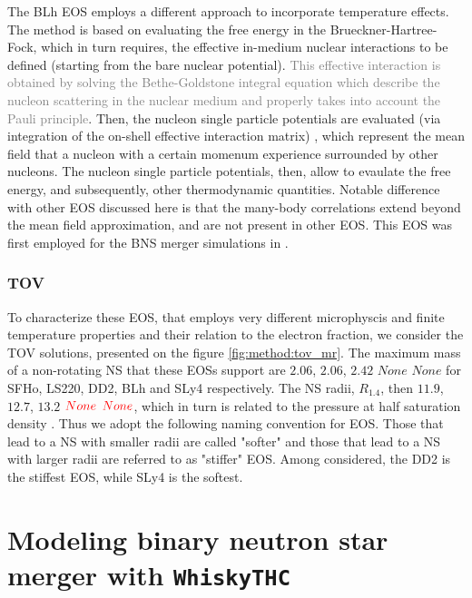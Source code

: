 \documentclass[11pt,a4paper,headinclude=true,DIV=14,BCOR=8mm,chapterprefix,listof=totoc,twoside,openright,abstracton]{scrbook}
\newcommand{\red}[1]{\textcolor{red}{#1}}
\newcommand{\gray}[1]{\textcolor{gray}{#1}}
\begin{document}
The BLh EOS employs a different approach to incorporate temperature effects.
The method is based on evaluating the free energy in the Brueckner-Hartree-Fock, which in turn requires,
the effective in-medium nuclear interactions to be defined (starting from the bare nuclear potential).
\gray{This effective interaction is obtained by solving
the Bethe-Goldstone integral equation which describe the nucleon 
scattering in the nuclear medium and properly takes into
account the Pauli principle}.
Then, the nucleon single particle potentials are evaluated (via integration of the on-shell effective interaction matrix)
, which represent the mean field that a nucleon with a certain momenum experience surrounded by other nucleons.
The nucleon single particle potentials, then, allow to evaulate the free energy, and subsequently, 
other thermodynamic quantities.
Notable difference with other EOS discussed here is that the many-body correlations extend beyond the mean field approximation, and are not present in other EOS. 
This EOS was first employed for the BNS merger simulations in \cite{Bernuzzi:2020txg}.

\subsubsection{TOV}

To characterize these EOS, that employs very different microphyscis and finite temperature properties and their relation to the electron fraction, we consider the TOV solutions, presented on the figure \ref{fig:method:tov_mr}.
The maximum mass of a non-rotating NS that these EOSs support are $2.06$, $2.06$, $2.42$ $None$ $None$ 
for SFHo, LS220, DD2, BLh and SLy4 respectively. The NS radii, $R_{1.4}$, then $11.9$, $12.7$, $13.2$ $\red{None}$ $\red{None}$, which in turn is related to the pressure at half saturation density \cite{Lattimer:2012nd}. Thus we adopt the following naming convention for EOS. Those that lead to a NS with smaller radii are called "softer" and those that lead to a NS with larger radii are referred to as "stiffer" EOS.
Among considered, the DD2 is the stiffest EOS, while SLy4 is the softest.



\section{Modeling binary neutron star merger with \texttt{WhiskyTHC}}
\end{document}
